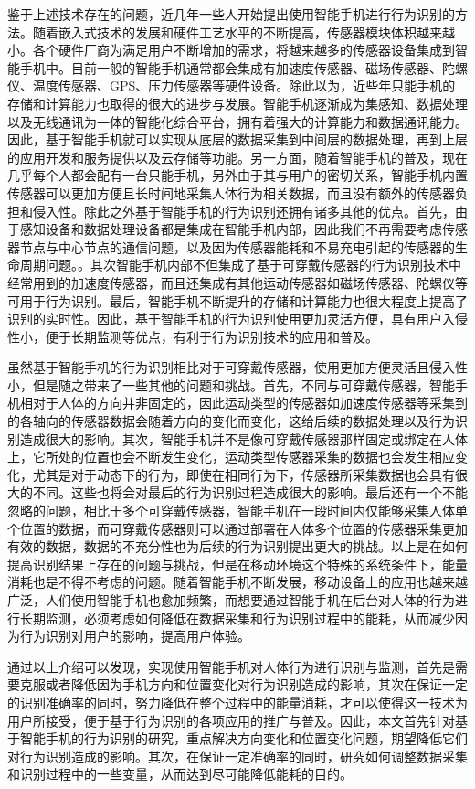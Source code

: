 \par 鉴于上述技术存在的问题，近几年一些人开始提出使用智能手机进行行为识别的方法。随着嵌入式技术的发展和硬件工艺水平的不断提高，传感器模块体积越来越小。各个硬件厂商为满足用户不断增加的需求，将越来越多的传感器设备集成到智能手机中。目前一般的智能手机通常都会集成有加速度传感器、磁场传感器、陀螺仪、温度传感器、GPS、压力传感器等硬件设备\cite{smartphoneSensor}。除此以为，近些年只能手机的存储和计算能力也取得的很大的进步与发展。智能手机逐渐成为集感知、数据处理以及无线通讯为一体的智能化综合平台，拥有着强大的计算能力和数据通讯能力。因此，基于智能手机就可以实现从底层的数据采集到中间层的数据处理，再到上层的应用开发和服务提供以及云存储等功能。另一方面，随着智能手机的普及，现在几乎每个人都会配有一台只能手机，另外由于其与用户的密切关系，智能手机内置传感器可以更加方便且长时间地采集人体行为相关数据，而且没有额外的传感器负担和侵入性。除此之外基于智能手机的行为识别还拥有诸多其他的优点。首先，由于感知设备和数据处理设备都是集成在智能手机内部，因此我们不再需要考虑传感器节点与中心节点的通信问题，以及因为传感器能耗和不易充电引起的传感器的生命周期问题。。其次智能手机内部不但集成了基于可穿戴传感器的行为识别技术中经常用到的加速度传感器，而且还集成有其他运动传感器如磁场传感器、陀螺仪等可用于行为识别。最后，智能手机不断提升的存储和计算能力也很大程度上提高了识别的实时性。因此，基于智能手机的行为识别使用更加灵活方便，具有用户入侵性小，便于长期监测等优点，有利于行为识别技术的应用和普及。
\par 虽然基于智能手机的行为识别相比对于可穿戴传感器，使用更加方便灵活且侵入性小，但是随之带来了一些其他的问题和挑战。首先，不同与可穿戴传感器，智能手机相对于人体的方向并非固定的，因此运动类型的传感器如加速度传感器等采集到的各轴向的传感器数据会随着方向的变化而变化，这给后续的数据处理以及行为识别造成很大的影响。其次，智能手机并不是像可穿戴传感器那样固定或绑定在人体上，它所处的位置也会不断发生变化，运动类型传感器采集的数据也会发生相应变化，尤其是对于动态下的行为，即使在相同行为下，传感器所采集数据也会具有很大的不同。这些也将会对最后的行为识别过程造成很大的影响。最后还有一个不能忽略的问题，相比于多个可穿戴传感器，智能手机在一段时间内仅能够采集人体单个位置的数据，而可穿戴传感器则可以通过部署在人体多个位置的传感器采集更加有效的数据，数据的不充分性也为后续的行为识别提出更大的挑战。以上是在如何提高识别结果上存在的问题与挑战，但是在移动环境这个特殊的系统条件下，能量消耗也是不得不考虑的问题。随着智能手机不断发展，移动设备上的应用也越来越广泛，人们使用智能手机也愈加频繁，而想要通过智能手机在后台对人体的行为进行长期监测，必须考虑如何降低在数据采集和行为识别过程中的能耗，从而减少因为行为识别对用户的影响，提高用户体验。
\par 通过以上介绍可以发现，实现使用智能手机对人体行为进行识别与监测，首先是需要克服或者降低因为手机方向和位置变化对行为识别造成的影响，其次在保证一定的识别准确率的同时，努力降低在整个过程中的能量消耗，才可以使得这一技术为用户所接受，便于基于行为识别的各项应用的推广与普及。因此，本文首先针对基于智能手机的行为识别的研究，重点解决方向变化和位置变化问题，期望降低它们对行为识别造成的影响。其次，在保证一定准确率的同时，研究如何调整数据采集和识别过程中的一些变量，从而达到尽可能降低能耗的目的。

